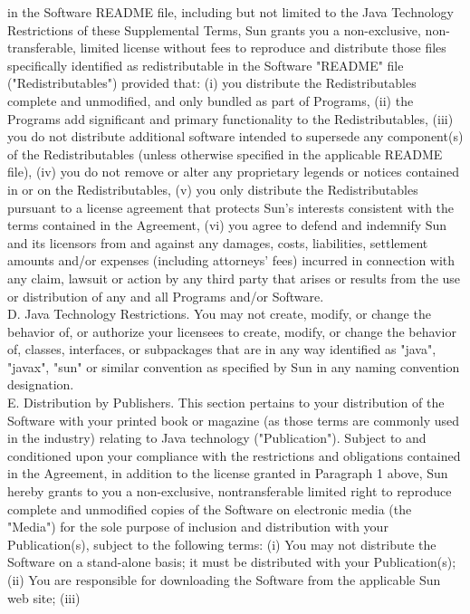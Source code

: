 {in the Software README file, including but not limited to the Java
Technology Restrictions of these Supplemental Terms, Sun grants you a
non-exclusive, non-transferable, limited license without fees to
reproduce and distribute those files specifically identified as
redistributable in the Software "README" file ("Redistributables")
provided that: (i) you distribute the Redistributables complete and
unmodified, and only bundled as part of Programs, (ii) the Programs
add significant and primary functionality to the Redistributables,
(iii) you do not distribute additional software intended to supersede
any component(s) of the Redistributables (unless otherwise specified
in the applicable README file), (iv) you do not remove or alter any
proprietary legends or notices contained in or on the
Redistributables, (v) you only distribute the Redistributables
pursuant to a license agreement that protects Sun's interests
consistent with the terms contained in the Agreement, (vi) you agree
to defend and indemnify Sun and its licensors from and against any
damages, costs, liabilities, settlement amounts and/or expenses
(including attorneys' fees) incurred in connection with any claim,
lawsuit or action by any third party that arises or results from the
use or distribution of any and all Programs and/or Software.
\\[4pt]
D. Java Technology Restrictions.  You may not create, modify, or
change the behavior of, or authorize your licensees to create, modify,
or change the behavior of, classes, interfaces, or subpackages that
are in any way identified as "java", "javax", "sun" or similar
convention as specified by Sun in any naming convention designation.
\\[4pt]
E. Distribution by Publishers. This section pertains to your
distribution of the Software with your printed book or magazine (as
those terms are commonly used in the industry) relating to Java
technology ("Publication"). Subject to and conditioned upon your
compliance with the restrictions and obligations contained in the
Agreement, in addition to the license granted in Paragraph 1 above,
Sun hereby grants to you a non-exclusive, nontransferable limited
right to reproduce complete and unmodified copies of the Software on
electronic media (the "Media") for the sole purpose of inclusion and
distribution with your Publication(s), subject to the following terms:
(i) You may not distribute the Software on a stand-alone basis; it
must be distributed with your Publication(s); (ii) You are responsible
for downloading the Software from the applicable Sun web site; (iii)
}
